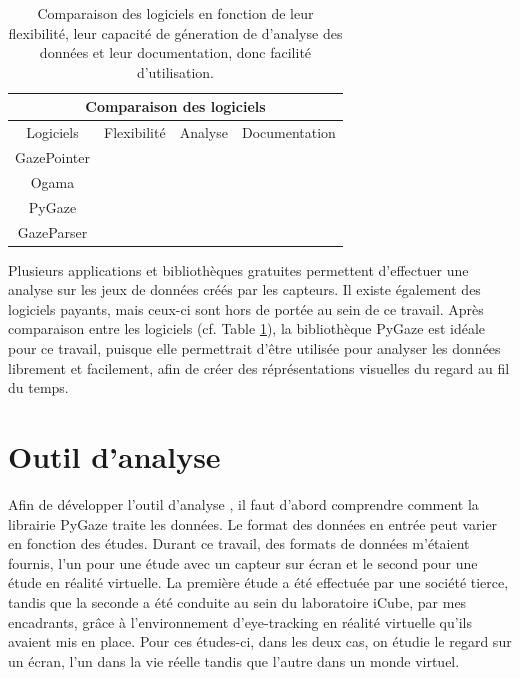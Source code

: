\documentclass[hidelinks,12pt]{article}
\newcommand{\cmark}{\ding{51}}
\newcommand{\xmark}{\ding{55}}
\begin{document}
\bigskip
\begin{table}[htpb]
  \begin{center}
    \begin{tabular}{|c||c|c|c|}
      \hline
      \multicolumn{4}{|c|}{Comparaison des logiciels}             \\
      \hline
      Logiciels   & Flexibilité   & Analyse       & Documentation \\
      \hline
      GazePointer & \xmark        & \cmark        & \cmark        \\
      Ogama       & \xmark        & \cmark \cmark & \cmark        \\
      PyGaze      & \cmark \cmark & \cmark \cmark & \cmark \cmark \\
      GazeParser  & \cmark        & \cmark \cmark & \cmark        \\
      \hline
    \end{tabular}
    \caption{Comparaison des logiciels en fonction de leur flexibilité, leur
      capacité de géneration de d'analyse des données et leur documentation,
      donc facilité d'utilisation.}
    \label{tab:comparaison}
  \end{center}
\end{table}

Plusieurs applications et bibliothèques gratuites permettent d'effectuer une
analyse sur les jeux de données créés par les capteurs. Il existe également des
logiciels payants, mais ceux-ci sont hors de portée au sein de ce
travail. Après comparaison entre les logiciels (cf. Table
\ref{tab:comparaison}), la bibliothèque PyGaze est idéale pour ce travail,
puisque elle permettrait d'être utilisée pour analyser les données librement et
facilement, afin de créer des réprésentations visuelles du regard au fil du
temps.


\section{Outil d'analyse}

Afin de développer l'outil d'analyse \cite{github_ter}, il faut d'abord
comprendre comment la librairie PyGaze traite les données. Le format des
données en entrée peut varier en fonction des études. Durant ce travail, des
formats de données m'étaient fournis, l'un pour une étude avec un capteur sur
écran et le second pour une étude en réalité virtuelle. La première étude a été
effectuée par une société tierce, tandis que la seconde a été conduite au sein
du laboratoire iCube, par mes encadrants, grâce à l'environnement
d'eye-tracking en réalité virtuelle qu'ils avaient mis en place. Pour ces
études-ci, dans les deux cas, on étudie le regard sur un écran, l'un dans la vie
réelle tandis que l'autre dans un monde virtuel.
\end{document}
